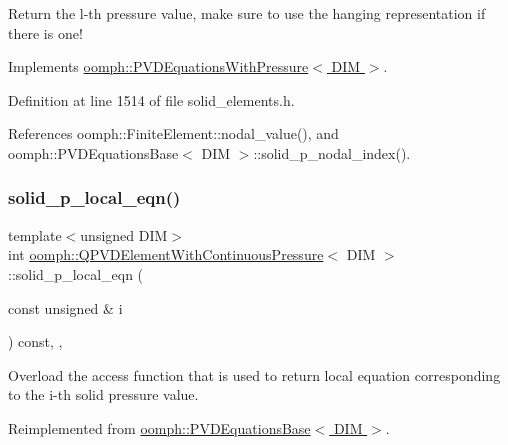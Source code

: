 Return the l-\/th pressure value, make sure to use the hanging representation if there is one! 

Implements \hyperlink{classoomph_1_1PVDEquationsWithPressure_a2f447e84104fbdd8afe9efe52c62f2b3}{oomph\+::\+P\+V\+D\+Equations\+With\+Pressure$<$ D\+I\+M $>$}.



Definition at line 1514 of file solid\+\_\+elements.\+h.



References oomph\+::\+Finite\+Element\+::nodal\+\_\+value(), and oomph\+::\+P\+V\+D\+Equations\+Base$<$ D\+I\+M $>$\+::solid\+\_\+p\+\_\+nodal\+\_\+index().

\mbox{\label{classoomph_1_1QPVDElementWithContinuousPressure_a97a8b3bc51a27731f21b06c1a95aaf45}} 
\subsubsection{\texorpdfstring{solid\+\_\+p\+\_\+local\+\_\+eqn()}{solid\_p\_local\_eqn()}}
{\footnotesize\ttfamily template$<$unsigned D\+IM$>$ \\
int \hyperlink{classoomph_1_1QPVDElementWithContinuousPressure}{oomph\+::\+Q\+P\+V\+D\+Element\+With\+Continuous\+Pressure}$<$ D\+IM $>$\+::solid\+\_\+p\+\_\+local\+\_\+eqn (\begin{DoxyParamCaption}\item[{const unsigned \&}]{i }\end{DoxyParamCaption}) const\hspace{0.3cm}{\ttfamily [inline]}, {\ttfamily [protected]}, {\ttfamily [virtual]}}



Overload the access function that is used to return local equation corresponding to the i-\/th solid pressure value. 



Reimplemented from \hyperlink{classoomph_1_1PVDEquationsBase_a30d30a7dd711c84a175bf820ea56e3ef}{oomph\+::\+P\+V\+D\+Equations\+Base$<$ D\+I\+M $>$}.



